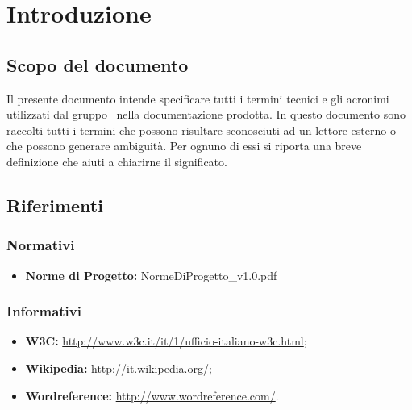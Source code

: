 \section{Introduzione}
\subsection{Scopo del documento}
Il presente documento intende specificare tutti i termini tecnici e gli acronimi utilizzati dal gruppo \gruppo\ nella documentazione prodotta. In questo documento sono raccolti tutti i termini che possono risultare sconosciuti ad un lettore esterno o che possono generare ambiguità. Per ognuno di essi si riporta una breve definizione che aiuti a chiarirne il significato.

\subsection{Riferimenti}
\subsubsection{Normativi}
\begin{itemize}
	\item \textbf{Norme di Progetto:} NormeDiProgetto\_v1.0.pdf
\end{itemize}
\subsubsection{Informativi}
\begin{itemize}
	\item \textbf{W3C:} \href{http://www.w3c.it/it/1/ufficio-italiano-w3c.html}{http://www.w3c.it/it/1/ufficio-italiano-w3c.html};
	\item \textbf{Wikipedia:} \href{http://it.wikipedia.org/}{http://it.wikipedia.org/}; 
	\item \textbf{Wordreference:} \href{http://www.wordreference.com/}{http://www.wordreference.com/}.
\end{itemize}